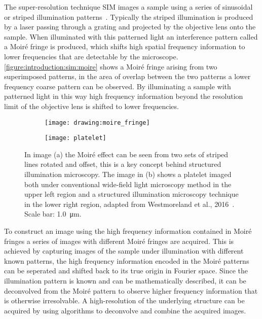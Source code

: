 The super-resolution technique SIM images a sample using a series of sinusoidal or striped illumination patterns~\cite{Gustafsson2000}. Typically the striped illumination is produced by a laser passing through a grating and projected by the objective lens onto the sample. When illuminated with this patterned light an interference pattern called a Moir\'e fringe is produced, which shifts high spatial frequency information to lower frequencies that are detectable by the microscope. \autoref{figure:introduction:sim:moire} shows a Moir\'e fringe arising from two superimposed patterns, in the area of overlap between the two patterns a lower frequency coarse pattern can be observed. By illuminating a sample with patterned light in this way high frequency information beyond the resolution limit of the objective lens is shifted to lower frequencies.

\begin{figure}[htbp!]\centering
\hspace*{\fill}
	\begin{subfigure}[b]{0.33\linewidth}
		\centering
		\texttt{[image: drawing:moire\_fringe]}
		\caption{}
		\label{figure:introduction:sim:moire}
	\end{subfigure}
	\hfill
	\begin{subfigure}[b]{0.33\linewidth}
		\centering
		\texttt{[image: platelet]}
		\caption{}
		\label{figure:introduction:sim:platelet}
	\end{subfigure}
\hspace*{\fill}
\caption[Structured illumination microscopy]{In image (a) the Moir\'e effect can be seen from two sets of striped lines rotated and offset, this is a key concept behind structured illumination microscopy. The image in (b) shows a platelet imaged both under conventional wide-field light microscopy method in the upper left region and a structured illumination microscopy technique in the lower right region, adapted from Westmoreland et al., 2016~\cite{Westmoreland2016}. Scale bar: \SI{1.0}{\micro\meter}.}
\label{figure:sim}
\end{figure}

To construct an image using the high frequency information contained in Moir\'e fringes a series of images with different Moir\'e fringes are acquired. 
This is achieved by capturing images of the sample under illumination with different known patterns, the high frequency information encoded in the Moir\'e patterns can be seperated and shifted back to its true origin in Fourier space. Since the illumination pattern is known and can be mathematically described, it can be deconvolved from the Moir\'e pattern to observe higher frequency information that is otherwise irresolvable. A high-resolution of the underlying structure can be acquired by using algorithms to deconvolve and combine the acquired images.

